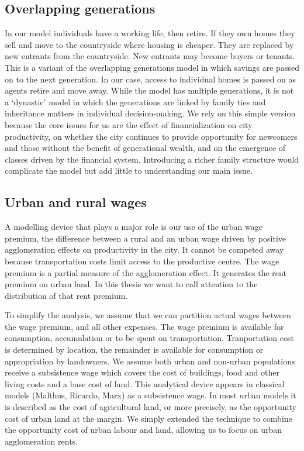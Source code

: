 {\subsection{Overlapping generations}
In our model individuals have a working life, then retire. If they own homes they sell and move to the countryside where housing is cheaper. They are replaced by new entrants from the countryside. New entrants may become buyers or tenants. This is a variant of the \gls{overlapping generations}  model in which savings are passed on to the next generation. In our case, access to individual  homes is passed on as agents retire and move away. While the model has multiple generations, it is not a `dynastic' model in which the generations are linked by family ties and inheritance matters in individual decision-making. We rely on this simple version because the core issues for us are the effect of financialization on city productivity, on whether the city continues to provide opportunity for newcomers and those without the benefit of generational wealth, and on the emergence of classes driven by the financial system. Introducing a richer family structure would complicate the model but add little to understanding  our main issue. 

\subsection{Urban and rural wages}
A modelling device that plays a major role is our use of the \gls{urban wage premium}, the difference between a rural and an urban wage driven by positive \gls{agglomeration effect}s on productivity in the city. It cannot be competed away because transportation costs limit access to the productive centre. The wage premium is a partial measure of the agglomeration effect. It generates the \gls{rent premium} on urban land. In this thesis we want to call attention to the distribution of that rent premium.

To simplify the analysis, we assume that we can partition actual wages between the wage premium,  and all other expenses. The wage premium  is available for consumption, accumulation or to be spent on transportation. Tranportation cost is determined by location, the remainder is available for consumption or appropriation by landowners. We assume both urban and non-urban populations  receive a \gls{subsistence wage} which covers  the cost of buildings, food and other living costs and a base cost of land. This analytical device appears in classical models (Malthus, Ricardo, Marx) as a subsistence wage. In most urban models it is described as the cost of agricultural land, or more precisely,  as the opportunity cost of urban land at the margin. We simply extended the technique to combine the opportunity cost of urban labour and land, allowing us to focus on urban agglomeration rents. 


}
